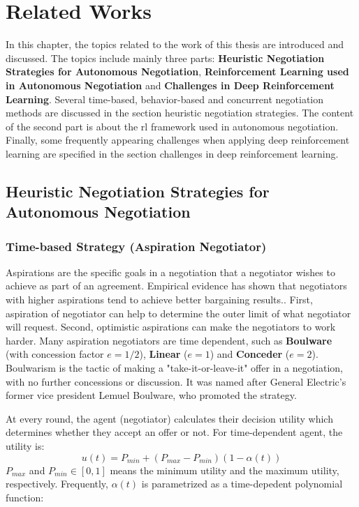 \chapter{Related Works}
In this chapter, the topics related to the work of this thesis are introduced and discussed. The topics include mainly three parts: \textbf{Heuristic Negotiation Strategies for Autonomous Negotiation}, \textbf{Reinforcement Learning used in Autonomous Negotiation} and \textbf{Challenges in Deep Reinforcement Learning}. Several time-based, behavior-based and concurrent negotiation methods are discussed in the section heuristic negotiation strategies. The content of the second part is about the \gls{rl} framework used in autonomous negotiation. Finally, some frequently appearing challenges when applying deep reinforcement learning are specified in the section challenges in deep reinforcement learning.

\section{Heuristic Negotiation Strategies for Autonomous Negotiation} \label{related-work:heuristic-negotiation}
\subsection{Time-based Strategy (Aspiration Negotiator)}
Aspirations are the specific goals in a negotiation that a negotiator wishes to achieve as part of an agreement. Empirical evidence has shown that negotiators with higher aspirations tend to achieve better bargaining results.. First, aspiration of negotiator can help to determine the outer limit of what negotiator will request. Second, optimistic aspirations can make the negotiators to work harder\parencite{Schneider2004}. Many aspiration negotiators are time dependent, such as \textbf{Boulware} (with concession factor $e=1/2$), \textbf{Linear} ($e=1$) and \textbf{Conceder} ($e=2$)\parencite{FARATIN1998159}. Boulwarism is the tactic of making a "take-it-or-leave-it" offer in a negotiation, with no further concessions or discussion. It was named after General Electric's former vice president Lemuel Boulware, who promoted the strategy\parencite{William1991}.

At every round, the agent (negotiator) calculates their decision utility which determines whether they accept an offer or not. For time-dependent agent, the utility is:
\begin{equation}
u(t) = P_{min} + (P_{max} - P_{min})(1-\alpha(t))
\end{equation}
$P_{max}$ and $P_{min} \in [0, 1]$ means the minimum utility and the maximum utility, respectively. Frequently, $\alpha(t)$ is parametrized as a time-depedent polynomial function\parencite{chang2020multiissue, FARATIN1998159}: 

